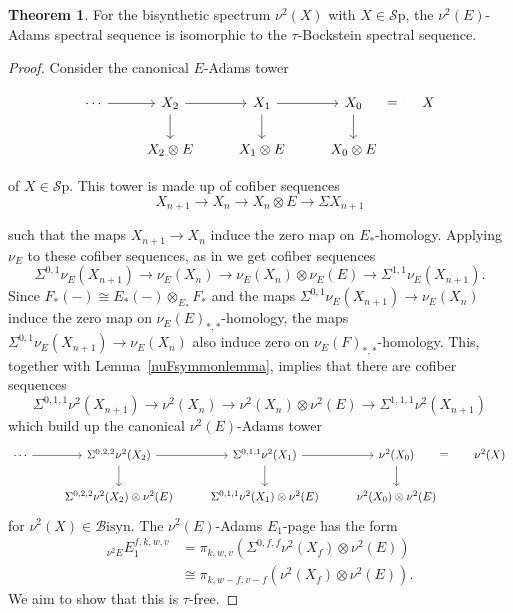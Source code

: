 \documentclass[10pt]{amsart}
\theoremstyle{definition}
\numberwithin{figure}{section}
\numberwithin{equation}{section}
\newtheorem{thm}[figure]{Theorem}
\theoremstyle{cited}
\newcommand{\Sp}{{\mathcal{S}\mathrm{p}}}
\newcommand{\Bisyn}{\mathcal{B}\mathrm{isyn}}
\begin{document}
\begin{thm}
    For the bisynthetic spectrum $\nu^2(X)$ with $X\in\Sp$, the $\nu^2(E)$-Adams spectral sequence is isomorphic to the $\tau$-Bockstein spectral sequence. 
\end{thm}

\begin{proof}
Consider  the canonical $E$-Adams tower

\begin{equation*}
	\begin{tikzcd}
\cdots \arrow[r] & X_2 \arrow[r] \arrow[d] & X_1 \arrow[r] \arrow[d] & X_0 \arrow[r, phantom, "{=}" description] \ar[d] & X \\
                 & X_2\otimes E      & X_1\otimes E      & X_0\otimes E &     
\end{tikzcd}
\end{equation*}

of $X\in\Sp$. This tower is made up of cofiber sequences
\begin{equation*}
X_{n+1}\to X_n\to X_n\otimes E\to\Sigma X_{n+1}
\end{equation*}

such that the maps $X_{n+1}\to X_n$ induce the zero map on $E_*$-homology. Applying $\nu_E$ to these cofiber sequences, as in \cite{BHS19} we get cofiber sequences
$$
\Sigma^{0,1}\nu_E(X_{n+1})\to \nu_E(X_n)\to \nu_E(X_n)\otimes \nu_E(E)\to\Sigma^{1,1} \nu_E(X_{n+1}).
$$
Since $F_*(-)\cong E_*(-)\otimes_{E_*}F_*$ and the maps $\Sigma^{0,1}\nu_E(X_{n+1})\to\nu_E(X_n)$ induce the zero map on $\nu_E(E)_{*,*}$-homology, the maps $\Sigma^{0,1}\nu_E(X_{n+1})\to\nu_E(X_n)$ also induce zero on $\nu_E(F)_{*,*}$-homology. This, together with Lemma~\ref{nuFsymmonlemma}, implies that there are cofiber sequences
$$
\Sigma^{0,1,1}\nu^2(X_{n+1})\to \nu^2(X_n)\to \nu^2(X_n)\otimes \nu^2(E)\to\Sigma^{1,1,1} \nu^2(X_{n+1})
$$
which build up the canonical $\nu^2(E)$-Adams tower
\begin{equation*}
	\begin{tikzcd}
\cdots \arrow[r] & \Sigma^{0,2,2}\nu^2(X_2) \arrow[r] \arrow[d] & \Sigma^{0,1,1}\nu^2(X_1) \arrow[r] \arrow[d] & \nu^2(X_0) \arrow[r, phantom, "{=}" description] \ar[d] & \nu^2(X) \\
                 & \Sigma^{0,2,2}\nu^2(X_2)\otimes\nu^2(E)      & \Sigma^{0,1,1}\nu^2(X_1)\otimes\nu^2(E)      & \nu^2(X_0)\otimes\nu^2(E)     
\end{tikzcd} 
\end{equation*}
for $\nu^2(X)\in\Bisyn$. The $\nu^2(E)$-Adams $E_1$-page has the form
$$
\begin{aligned}
{}_{\nu^2E}E_1^{f,k,w,v}&=\pi_{k,w,v}(\Sigma^{0,f,f}\nu^2(X_f)\otimes\nu^2(E)) \\
&\cong\pi_{k,w-f,v-f}(\nu^2(X_f)\otimes\nu^2(E)).
\end{aligned}
$$
We aim to show that this is $\tau$-free. 
\end{proof}

\printbibliography
\end{document}
